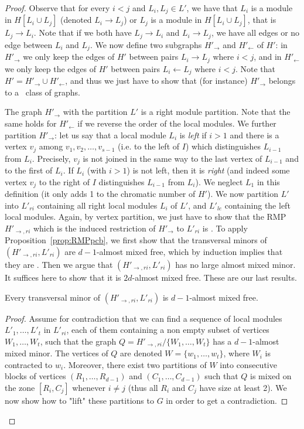 \begin{proof}
Observe that for every $i<j$ and $L_i,L_j\in L'$, we have that $L_i$ is a module in $H[L_i\cup L_j]$ (denoted $L_i\rightarrow L_j$) or $L_j$ is a module in $H[L_i\cup L_j]$, that is $L_j\rightarrow L_i$. Note that if we both have $L_j\rightarrow L_i$ and $L_i\rightarrow L_j$, we have all edges or no edge between $L_i$ and $L_j$. We now define two subgraphs $H'_{\rightarrow}$ and $H'_{\leftarrow}$ of $H'$: in $H'_{\rightarrow}$ we only keep the edges of $H'$ between pairs $L_i\rightarrow L_j$ where $i<j$, and in $H'_{\leftarrow}$ we only keep the edges of $H'$ between pairs $L_i\leftarrow L_j$ where $i<j$.
Note that $H'=H'_{\rightarrow}\cup H'_{\leftarrow}$, and thus we just have to show that (for instance) $H'_{\rightarrow}$ belongs to a \pcb~class of graphs.

The graph $H'_{\rightarrow}$ with the partition $L'$ is a right module partition. Note that the same holds for $H'_{\leftarrow}$ if we reverse the order of the local modules. 
We further partition $H'_{\rightarrow}$: let us say that a local module $L_i$ is \emph{left} if $i>1$ and there is a vertex $v_j$ among $v_1,v_2,\dots,v_{s-1}$ (i.e. to the left of $I$) which distinguishes $L_{i-1}$ from $L_i$. Precisely, $v_j$ is not joined in the same way to the last vertex of $L_{i-1}$ and to the first of $L_i$. If $L_i$ (with $i>1$) is not left, then it is \emph{right} (and indeed some vertex $v_j$ to the right of $I$ distinguishes $L_{i-1}$ from $L_i$). We neglect $L_1$ in this definition (it only adds 1 to the chromatic number of $H'$). We now partition $L'$ into $L'_{ri}$ containing all right local modules $L_i$ of $L'$, and $L'_{le}$ containing the left local modules. Again, by vertex partition, we just have to show that the RMP $H'_{\rightarrow,ri}$ which is the induced restriction of $H'_{\rightarrow}$ to $L'_{ri}$ is \pcb. To apply Proposition~\ref{prop:RMPpcb}, we first show that the transversal minors of  $(H'_{\rightarrow,ri},L'_{ri})$ are $d-1$-almost mixed free, which by induction implies that they are \pcb. Then we argue that $(H'_{\rightarrow, ri},L'_{ri})$ has no large almost mixed minor. It suffices here to show that it is $2d$-almost mixed free. These are our last results.

\begin{claim}[\cite{PS22}]\label{claim:twwreduction}
    Every transversal minor of  $(H'_{\rightarrow,ri},L'_{ri})$ is $d-1$-almost mixed free.
\end{claim}

\begin{proof}
Assume for contradiction that we can find a sequence of local modules $L'_1,\dots ,L'_t$ in $L'_{ri}$, each of them containing a non empty subset of vertices $W_1,\dots ,W_t$, such that the graph $Q=H'_{\rightarrow,ri}/\{W_1,\dots ,W_t\}$ has a $d-1$-almost mixed minor. The vertices of $Q$ are denoted $W=\{w_1,\dots ,w_t\}$, where $W_i$ is contracted to $w_i$. Moreover, there exist two partitions of $W$ into consecutive blocks of vertices $(R_1,\dots ,R_{d-1})$ and $(C_1,\dots ,C_{d-1})$ such that $Q$ is mixed on the zone $[R_i,C_j]$ whenever $i\neq j$ (thus all $R_i$ and $C_j$ have size at least 2). We now show how to "lift" these partitions to $G$ in order to get a contradiction.


\end{proof}
\end{proof}
